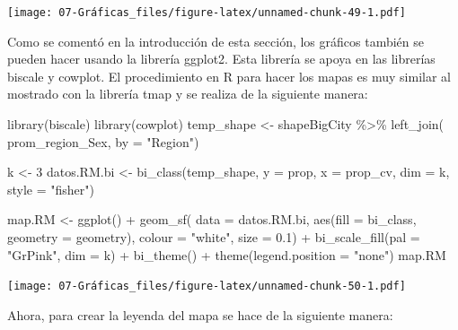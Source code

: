 \documentclass[
  12pt,
]{book}
\newenvironment{Shaded}{\begin{snugshade}}{\end{snugshade}}
\newcommand{\AttributeTok}[1]{\textcolor[rgb]{0.77,0.63,0.00}{#1}}
\newcommand{\DecValTok}[1]{\textcolor[rgb]{0.00,0.00,0.81}{#1}}
\newcommand{\FloatTok}[1]{\textcolor[rgb]{0.00,0.00,0.81}{#1}}
\newcommand{\FunctionTok}[1]{\textcolor[rgb]{0.00,0.00,0.00}{#1}}
\newcommand{\NormalTok}[1]{#1}
\newcommand{\OtherTok}[1]{\textcolor[rgb]{0.56,0.35,0.01}{#1}}
\newcommand{\SpecialCharTok}[1]{\textcolor[rgb]{0.00,0.00,0.00}{#1}}
\newcommand{\StringTok}[1]{\textcolor[rgb]{0.31,0.60,0.02}{#1}}
\begin{document}
\texttt{[image: 07-Gráficas\_files/figure-latex/unnamed-chunk-49-1.pdf]}

Como se comentó en la introducción de esta sección, los gráficos también se pueden hacer usando la librería ggplot2. Esta librería se apoya en las librerías biscale y cowplot. El procedimiento en R para hacer los mapas es muy similar al mostrado con la librería tmap y se realiza de la siguiente manera:

\begin{Shaded}
\begin{Highlighting}[]
\FunctionTok{library}\NormalTok{(biscale)}
\FunctionTok{library}\NormalTok{(cowplot)}
\NormalTok{temp\_shape }\OtherTok{\textless{}{-}}\NormalTok{ shapeBigCity }\SpecialCharTok{\%\textgreater{}\%}
  \FunctionTok{left\_join}\NormalTok{(}
\NormalTok{    prom\_region\_Sex,}
    \AttributeTok{by =} \StringTok{"Region"}\NormalTok{)}

\NormalTok{k }\OtherTok{\textless{}{-}} \DecValTok{3}
\NormalTok{datos.RM.bi }\OtherTok{\textless{}{-}} \FunctionTok{bi\_class}\NormalTok{(temp\_shape,}
  \AttributeTok{y =}\NormalTok{ prop, }\AttributeTok{x =}\NormalTok{ prop\_cv, }\AttributeTok{dim =}\NormalTok{ k,}
  \AttributeTok{style =} \StringTok{"fisher"}\NormalTok{)}

\NormalTok{map.RM }\OtherTok{\textless{}{-}} \FunctionTok{ggplot}\NormalTok{() }\SpecialCharTok{+}
  \FunctionTok{geom\_sf}\NormalTok{(}
    \AttributeTok{data =}\NormalTok{ datos.RM.bi,}
    \FunctionTok{aes}\NormalTok{(}\AttributeTok{fill =}\NormalTok{ bi\_class, }\AttributeTok{geometry =}\NormalTok{ geometry),}
    \AttributeTok{colour =} \StringTok{"white"}\NormalTok{, }\AttributeTok{size =} \FloatTok{0.1}\NormalTok{) }\SpecialCharTok{+}
  \FunctionTok{bi\_scale\_fill}\NormalTok{(}\AttributeTok{pal =} \StringTok{"GrPink"}\NormalTok{, }\AttributeTok{dim =}\NormalTok{ k) }\SpecialCharTok{+}
  \FunctionTok{bi\_theme}\NormalTok{() }\SpecialCharTok{+}
  \FunctionTok{theme}\NormalTok{(}\AttributeTok{legend.position =} \StringTok{"none"}\NormalTok{)}
\NormalTok{map.RM}
\end{Highlighting}
\end{Shaded}

\texttt{[image: 07-Gráficas\_files/figure-latex/unnamed-chunk-50-1.pdf]}

Ahora, para crear la leyenda del mapa se hace de la siguiente manera:
\end{document}
